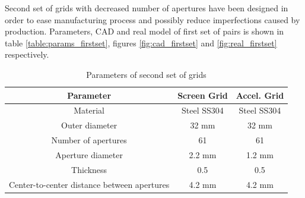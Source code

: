 \newpage

Second set of grids with decreased number of apertures have been designed in order to ease manufacturing process and possibly reduce imperfections caused by production. Parameters, CAD and real model of first set of pairs is shown in table \ref{table:params_firstset}, figures \ref{fig:cad_firstset} and \ref{fig:real_firstset} respectively.

\begin{table}[ht]
    \centering
    \begin{tabular}{||c|c|c||}
        \hline
        \textbf{Parameter} & \textbf{Screen Grid} & \textbf{Accel. Grid} \\
        \hline
        Material & Steel SS304 & Steel SS304 \\
        \hline
        Outer diameter & 32 mm & 32 mm \\
        \hline
        Number of apertures & 61 & 61 \\
        \hline
        Aperture diameter & 2.2 mm & 1.2 mm \\
        \hline
        Thickness & 0.5 & 0.5 \\
        \hline
        Center-to-center distance between apertures & 4.2 mm & 4.2 mm \\
        \hline      
    \end{tabular}
\caption{Parameters of second set of grids}
\label{table:params_secondset}
\end{table}

